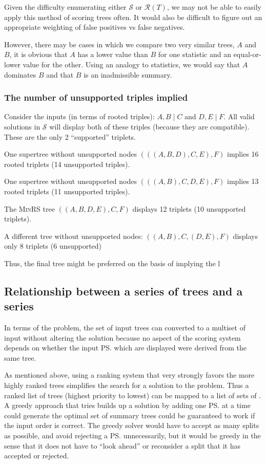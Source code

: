 \documentclass[11pt]{article}
\begin{document}
Given the difficulty enumerating either $\mathcal{S}$ or $\mathcal{R}(T)$, we may not be able to easily 
    apply this method of scoring trees often.
It would also be difficult to figure out an appropriate weighting of false positives vs false negatives.

However, there may be cases in which we compare two very similar trees, $A$ and $B$, it is obvious
    that $A$ has a lower value than $B$ for one statistic and an equal-or-lower value for the other.
Using an analogy to statistics, we would say that $A$ dominates $B$ and that $B$ is an inadmissible summary.

\subsubsection{The number of unsupported triples implied}

Consider the inputs (in terms of rooted triples): $A,B\mid C$ and $D,E\mid F$.
All valid solutions in $\mathcal{S}$ will display both of these triples (because they are compatible).
These are the only 2 ``supported'' triplets.

One supertree without unsupported nodes $(((A,B,D),C,E),F)$ 
implies 16 rooted triplets (14 unsupported triples).

One supertree without unsupported nodes $(((A,B),C,D,E),F)$ 
implies 13 rooted triplets (11 unsupported triples).

The \textsc{MinRS} tree $((A,B,D,E),C,F)$ displays 12 triplets (10 unsupported triplets).

A different tree without unsupported nodes: $((A,B),C,(D,E),F)$ displays only 8 triplets (6 unsupported)

Thus, the final tree might be preferred on the basis of implying the l

\subsection{Relationship between a series of trees and a series \pss}\label{orderPSsTheory}
In terms of the \MSWIPSD problem, the set of input trees can converted to a multiset of input \pss without 
    altering the solution because no aspect of the scoring system depends on whether the input \ps
    which are displayed were derived from the same tree.

As mentioned above, using a ranking system that very strongly favors the more highly ranked trees
    simplifies the search for a solution to the \MSWIPSD problem.
Thus a ranked list of trees (highest priority to lowest) can be mapped to a list of sets of \pss.
A greedy approach that tries builds up a solution by adding one \ps at a time could generate the optimal
    set of summary trees could be guaranteed to work if the input order is correct.
The greedy solver would have to accept as many splits as possible, and avoid rejecting a \ps unnecessarily,
    but it would be greedy in the sense that it does not have to ``look ahead'' or reconsider a split
    that it has accepted or rejected.
\end{document}
